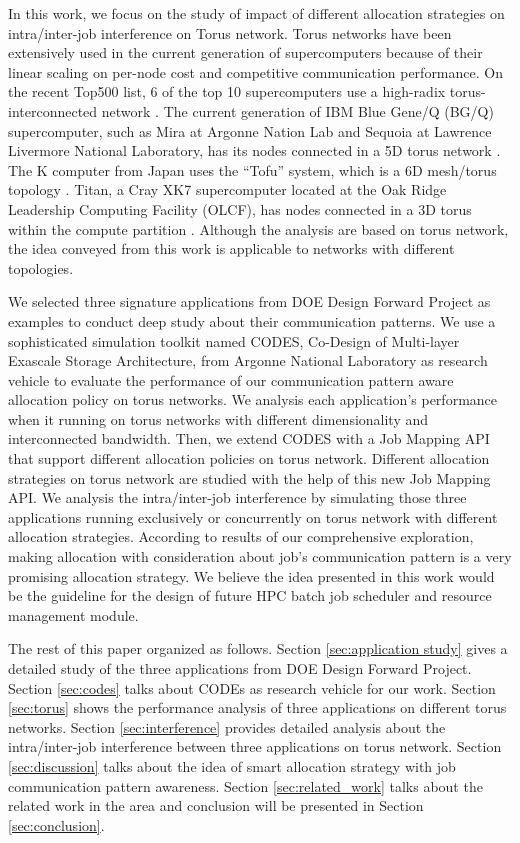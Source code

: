 \documentclass[conference]{IEEEtran}
\begin{document}
In this work, we focus on the study of impact of different allocation strategies on intra/inter-job interference on Torus network. Torus networks have been extensively used in the current generation of supercomputers because of their linear scaling on per-node cost and competitive communication performance. On the recent Top500 list, 6 of the top 10 supercomputers use a high-radix torus-interconnected network \cite{top500}. The current generation of IBM Blue Gene/Q (BG/Q) supercomputer, such as Mira at Argonne Nation Lab and Sequoia at  Lawrence Livermore National Laboratory, has its nodes connected in a 5D torus network \cite{bgq}. The K computer from Japan uses the “Tofu” system, which is a 6D mesh/torus topology \cite{tofu}. Titan, a Cray XK7 supercomputer located at the Oak Ridge Leadership Computing Facility (OLCF), has nodes connected in a 3D torus within the compute partition \cite{titan}. Although the analysis are based on torus network, the idea conveyed from this work is applicable to networks with different topologies. 

We selected three signature applications from DOE Design Forward Project\cite{design forward webpage} as examples to conduct deep study about their communication patterns. We use a sophisticated simulation toolkit named CODES, Co-Design of Multi-layer Exascale Storage Architecture\cite{Jason-2011}, from Argonne National Laboratory as research vehicle to evaluate the performance of our communication pattern aware allocation policy on torus networks. We analysis each application's performance when it running on torus networks with different dimensionality and interconnected bandwidth. Then, we extend CODES with a Job Mapping API that support different allocation policies on torus network. Different allocation strategies on torus network are studied with the help of this new Job Mapping API. We analysis the intra/inter-job interference by simulating those three applications running exclusively or concurrently on torus network with different allocation strategies. According to results of our comprehensive exploration, making allocation with consideration about job's communication pattern is a very promising allocation strategy. We believe the idea presented in this work would be the guideline for the design of future HPC batch job scheduler and resource management module. 

The rest of this paper organized as follows. Section \ref{sec:application study} gives a detailed study of the three applications from DOE Design Forward Project. Section \ref{sec:codes} talks about CODEs as research vehicle for our work. Section \ref{sec:torus} shows the performance analysis of three applications on different torus networks. Section \ref{sec:interference} provides detailed analysis about the intra/inter-job interference between three applications on torus network. Section \ref{sec:discussion} talks about the idea of smart allocation strategy with job communication pattern awareness. Section \ref{sec:related_work} talks about the related work in the area and conclusion will be presented in Section \ref{sec:conclusion}. 
\end{document}
